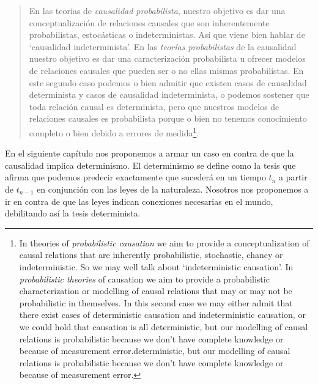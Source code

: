 \begin{quote}
  En las teorias de \textit{causalidad probabilista}, nuestro objetivo es dar una conceptualización de relaciones causales que son inherentemente probabilistas, estocásticas o indeterministas. Así que viene bien hablar de `causalidad indeterminista'. En las \textit{teorías probabilistas} de la causalidad nuestro objetivo es dar una caracterización probabilista u ofrecer modelos de relaciones causales que pueden ser o no ellas mismas probabilistas. En este segundo caso podemos o bien admitir que existen casos de causalidad determinista y casos de causalidad indeterminista, o podemos sostener que toda relación causal es determinista, pero que nuestros modelos de relaciones causales es probabilista porque o bien no tenemos conocimiento completo o bien debido a errores de medida\footnote{In theories of \emph{probabilistic causation} we aim to provide a conceptualization of causal relations that are inherently probabilistic, stochastic, chancy or indeterministic. So we may well talk about ‘indeterministic causation’. In \emph{probabilistic theories} of causation we aim to provide a probabilistic characterization or modelling of causal relations that may or may not be probabilistic in themselves. In this second case we may either admit that there exist cases of deterministic causation and indeterministic causation, or we could hold that causation is all deterministic, but our modelling of causal relations is probabilistic because we don’t have complete knowledge or because of measurement error.deterministic, but our modelling of causal relations is probabilistic because we don’t have complete knowledge or because of measurement error.}. \cite[p. 82-83]{Illari2014}
\end{quote}

En el siguiente capítulo nos proponemos a armar un caso en contra de que la causalidad implica determinismo. El determinismo se define como la tesis que afirma que podemos predecir exactamente que sucederá en un tiempo $t_{n}$ a partir de $t_{n-1}$ en conjunción con las leyes de la naturaleza. Nosotros nos proponemos a ir en contra de que las leyes indican conexiones necesarias en el mundo, debilitando así la tesis determinista.
